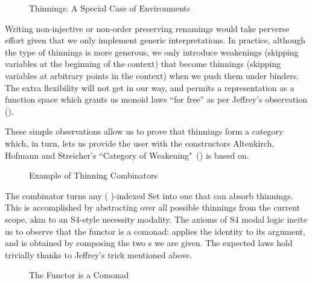 \begin{figure}[h]
\caption{Thinnings: A Special Case of Environments\label{fig:thinnings}}
\end{figure}

Writing non-injective or non-order preserving renamings would take perverse effort
given that we only implement generic interpretations. In practice, although the type
of thinnings is more generous, we only introduce weakenings (skipping variables at
the beginning of the context) that become thinnings (skipping variables at arbitrary
points in the context) when we push them under binders. The extra flexibility will not
get in our way, and permits a representation as a function space which grants us monoid
laws ``for free'' as per Jeffrey's observation (\citeyear{jeffrey2011assoc}).

These simple observations allow us to prove that thinnings form a category which,
in turn, lets us provide the user with the constructors Altenkirch, Hofmann and
Streicher's ``Category of Weakening"~(\citeyear{altenkirch1995categorical}) is based on.

\begin{figure}[h]
\caption{Example of Thinning Combinators\label{fig:extendth}}
\end{figure}

The  combinator turns any ( )-indexed Set into one that can
absorb thinnings. This is accomplished by abstracting over all possible thinnings
from the current scope, akin to an S4-style necessity modality. The axioms of S4
modal logic incite us to observe that the functor  is a comonad: 
applies the identity  to its argument, and  is obtained
by composing the two s we are given. The expected laws hold trivially
thanks to Jeffrey's trick mentioned above.

\begin{figure}[h]
\begin{minipage}{0.5\textwidth}
\end{minipage}\begin{minipage}{0.5\textwidth}
\end{minipage}
\caption{The  Functor is a Comonad}
\end{figure}

